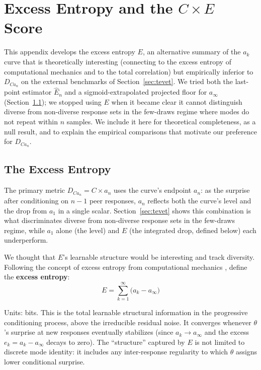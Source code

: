 \section{Excess Entropy and the \texorpdfstring{$C \times E$}{C x E} Score}\label{app:excess-entropy}

This appendix develops the excess entropy $E$, an alternative summary of the $a_k$ curve that is theoretically interesting (connecting to the excess entropy of computational mechanics \citep{crutchfield2003regularities} and to the total correlation) but empirically inferior to $D_{Ca_n}$ on the external benchmarks of Section~\ref{sec:tevet}.
We tried both the last-point estimator $\hat E_n$ and a sigmoid-extrapolated projected floor for $a_\infty$ (Section~\ref{app:excess-entropy-def}); we stopped using $E$ when it became clear it cannot distinguish diverse from non-diverse response sets in the few-draws regime where modes do not repeat within $n$ samples.
We include it here for theoretical completeness, as a null result, and to explain the empirical comparisons that motivate our preference for $D_{Ca_n}$.

\subsection{The Excess Entropy}\label{app:excess-entropy-def}

The primary metric $D_{Ca_n} = C \times a_n$ uses the curve's endpoint $a_n$: as the surprise after conditioning on $n-1$ peer responses, $a_n$ reflects both the curve's level and the drop from $a_1$ in a single scalar.
Section~\ref{sec:tevet} shows this combination is what discriminates diverse from non-diverse response sets in the few-draws regime, while $a_1$ alone (the level) and $E$ (the integrated drop, defined below) each underperform.

We thought that $E$'s learnable structure would be interesting and track diversity.
Following the concept of excess entropy from computational mechanics \citep{crutchfield2003regularities}, define the \textbf{excess entropy}:
\begin{equation}\label{eq:excess}
    E = \sum_{k=1}^{\infty}\bigl(a_k - a_\infty\bigr)
\end{equation}

Units: bits.
This is the total learnable structural information in the progressive conditioning process, above the irreducible residual noise.
It converges whenever $\theta$'s surprise at new responses eventually stabilizes (since $a_k \to a_\infty$ and the excess $e_k = a_k - a_\infty$ decays to zero).
The ``structure'' captured by $E$ is not limited to discrete mode identity: it includes any inter-response regularity to which $\theta$ assigns lower conditional surprise.

